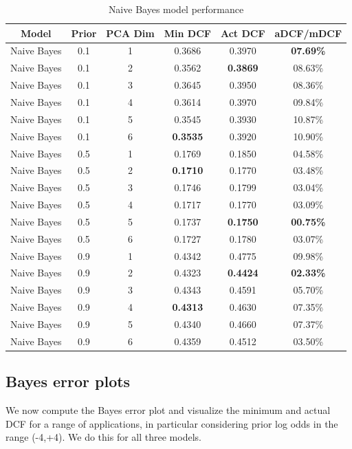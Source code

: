 \documentclass[12pt, a4paper]{article}
\begin{document}
\begin{table}[ht!]
	\centering
	\begin{tabular}{| | c c c c c c | |}
		\hline
		Model & Prior & PCA Dim & Min DCF & Act DCF & aDCF/mDCF \\
		\hline\hline
		Naive Bayes & 0.1 & 1 & 0.3686 & 0.3970 & \textbf{07.69\%} \\
		\hline
		Naive Bayes & 0.1 & 2 & 0.3562 & \textbf{0.3869} & 08.63\% \\
		\hline
		Naive Bayes & 0.1 & 3 & 0.3645 & 0.3950 & 08.36\% \\
		\hline
		Naive Bayes & 0.1 & 4 & 0.3614 & 0.3970 & 09.84\% \\
		\hline
		Naive Bayes & 0.1 & 5 & 0.3545 & 0.3930 & 10.87\% \\
		\hline
		Naive Bayes & 0.1 & 6 & \textbf{0.3535} & 0.3920 & 10.90\% \\
		\hline\hline
		Naive Bayes & 0.5 & 1 & 0.1769 & 0.1850 & 04.58\% \\
		\hline
		Naive Bayes & 0.5 & 2 & \textbf{0.1710} & 0.1770 & 03.48\% \\
		\hline
		Naive Bayes & 0.5 & 3 & 0.1746 & 0.1799 & 03.04\% \\
		\hline
		Naive Bayes & 0.5 & 4 & 0.1717 & 0.1770 & 03.09\% \\
		\hline
		Naive Bayes & 0.5 & 5 & 0.1737 & \textbf{0.1750} & \textbf{00.75\%} \\
		\hline
		Naive Bayes & 0.5 & 6 & 0.1727 & 0.1780 & 03.07\% \\
		\hline\hline
		Naive Bayes & 0.9 & 1 & 0.4342 & 0.4775 & 09.98\% \\
		\hline
		Naive Bayes & 0.9 & 2 & 0.4323 & \textbf{0.4424} & \textbf{02.33\%} \\
		\hline
		Naive Bayes & 0.9 & 3 & 0.4343 & 0.4591 & 05.70\% \\
		\hline
		Naive Bayes & 0.9 & 4 & \textbf{0.4313} & 0.4630 & 07.35\% \\
		\hline
		Naive Bayes & 0.9 & 5 & 0.4340 & 0.4660 & 07.37\% \\
		\hline
		Naive Bayes & 0.9 & 6 & 0.4359 & 0.4512 & 03.50\% \\
		\hline
	\end{tabular}
	\caption{Naive Bayes model performance}
\end{table}

\clearpage

\subsection{Bayes error plots}
We now compute the Bayes error plot and visualize the minimum and actual DCF for a range of applications, in particular considering prior log odds in the range (-4,+4). We do this for all three models.
\end{document}
